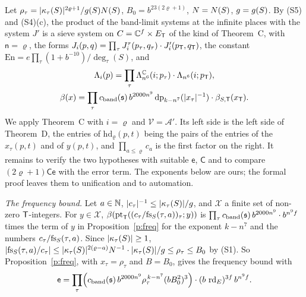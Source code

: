 \documentclass[11pt,a4paper]{article}
\makeatletter
\theoremstyle{plainx}
\theoremstyle{uprightx}
\renewenvironment{proof}[1][Proof]{\par\pushQED{\qed}\normalfont\topsep0pt\partopsep0pt
  \trivlist\item[\hskip\labelsep\itshape #1.]\ignorespaces}{\popQED\endtrivlist\@endpefalse}
\newcommand{\Inp}[1]{\textup{(#1)}}
\makeatother
\begin{document}
\begin{proof}[Proof of Theorem D]
Let $\rho_\tau=|\kappa_{\tau}(S)|^{2\varrho+1}/g(S)N(S)$, $B_0=b^{23(2\varrho+1)}$, $N=N(S)$, $g=g(S)$. By \Inp{S5} and
\Inp{S4}(c), the product of the band-limit systems at the infinite places with the system $J'$ is a sieve system on
$C=\mathbb{C}^{f}\times E_{\mathsf{T}}$ of the kind of Theorem~C, with $\mathsf{n}=\varrho$, the forms
$J_i(p,q)=\prod_\tau J^{\tau}_i(p_\tau,q_\tau)\cdot J'_i(p_{\mathsf{T}},q_{\mathsf{T}})$, the constant
$\mathrm{En}=e\prod_\tau(1+b^{-10})/\deg_\tau(S)$, and
\begin{gather*}\Lambda_i(p)=\prod_\tau\Lambda^{\mathbb{C}}_{n^{6}}(i;p_\tau)\cdot\Lambda_{n^{6}}(i;p_{\mathsf{T}}),\\
\beta(x)=\prod_\tau c_{\mathrm{band}}(\mathfrak{s})\,b^{2000n^{9}}\operatorname{dp}_{k-n^{7}}(|x_\tau|^{-1})\cdot\beta_{S,\mathsf{T}}(x_{\mathsf{T}}).\end{gather*}
We apply Theorem~C with $i=\varrho$ and $\mathcal{V}=\mathcal{A}'$. Its left side is the left side of Theorem~D, the
entries of $\mathrm{hd}_\varrho(p,t)$ being the pairs of the entries of the $x_\tau(p,t)$ and of $y(p,t)$, and
$\prod_{a\le\varrho}c_a$ is the first factor on the right. It remains to verify the two hypotheses with suitable
$\mathsf{e}$, $\mathsf{C}$ and to compare $(2\varrho+1)\mathsf{C}\mathsf{e}$ with the error term. The exponents below
are ours; the formal proof leaves them to unification and to automation.

\emph{The frequency bound.} Let $a\in\mathbb{N}$, $|c_\tau|^{-1}\le|\kappa_{\tau}(S)|/g$, and $\mathcal{X}$ a finite set of
non-zero $\mathsf{T}$-integers. For $y\in\mathcal{X}$,
$\beta(\mathrm{pt}_{\mathsf{T}}((c_\tau/\mathrm{fs}_{S}(\tau,a))_\tau;y))$ is $\prod_\tau c_{\mathrm{band}}(\mathfrak{s})\,b^{2000n^{9}}\cdot b^{n^{9}f}$ times
the term of $y$ in Proposition~\ref{p:freq} for the exponent $k-n^{7}$ and the numbers $c_\tau/\mathrm{fs}_{S}(\tau,a)$.
Since $|\kappa_{\tau}(S)|\ge1$,
$|\mathrm{fs}_{S}(\tau,a)/c_\tau|\le|\kappa_{\tau}(S)|^{2(\varrho-a)}N^{-1}\cdot|\kappa_{\tau}(S)|/g\le\rho_\tau\le B_0$ by
\Inp{S1}. So Proposition~\ref{p:freq}, with $x_\tau=\rho_\tau$ and $B=B_0$, gives the frequency bound with
\[\mathsf{e}=\prod_\tau\Bigl(c_{\mathrm{band}}(\mathfrak{s})\,b^{2000n^{9}}\rho_\tau^{\,k-n^{7}}(bB_0^{2})^{3}\Bigr)\cdot(b\,\operatorname{rd}_{E})^{3f}\,b^{n^{9}f}.\]


\end{proof}
\end{document}
